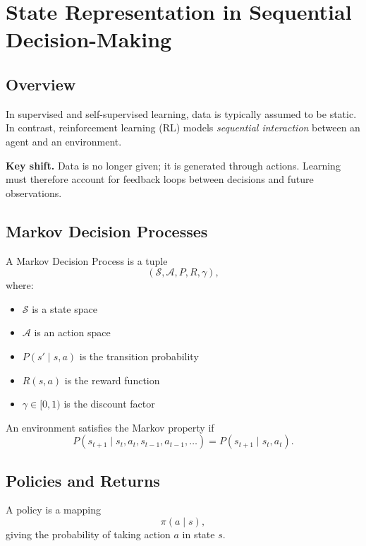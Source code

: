 \section{State Representation in Sequential Decision-Making}

\subsection{Overview}

In supervised and self-supervised learning, data is typically assumed to be static.  
In contrast, reinforcement learning (RL) models \emph{sequential interaction} between an agent and an environment.

\medskip

\noindent
\textbf{Key shift.}  
Data is no longer given; it is generated through actions.  
Learning must therefore account for feedback loops between decisions and future observations.

\subsection{Markov Decision Processes}

\begin{definition}
A Markov Decision Process is a tuple
\[
(\mathcal{S}, \mathcal{A}, P, R, \gamma),
\]
where:
\begin{itemize}
\item $\mathcal{S}$ is a state space
\item $\mathcal{A}$ is an action space
\item $P(s' \mid s,a)$ is the transition probability
\item $R(s,a)$ is the reward function
\item $\gamma \in [0,1)$ is the discount factor
\end{itemize}
\end{definition}

\begin{definition}
An environment satisfies the Markov property if
\[
P(s_{t+1} \mid s_t, a_t, s_{t-1}, a_{t-1}, \dots)
= P(s_{t+1} \mid s_t, a_t).
\]
\end{definition}

\subsection{Policies and Returns}

\begin{definition}[Policy]
A policy is a mapping
\[
\pi(a \mid s),
\]
giving the probability of taking action $a$ in state $s$.
\end{definition}

